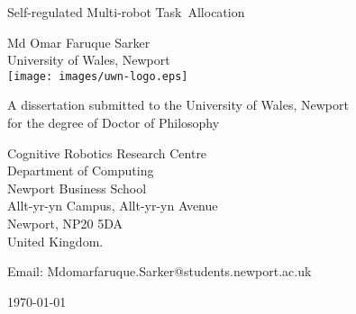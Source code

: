 %
%
%
%
\begin{titlepage}

\begin{center}
\noindent
\huge
Self-regulated Multi-robot Task~Allocation
\end{center}

\begin{center}
\noindent
\huge
Md Omar Faruque Sarker\\[10pt]
\large
University of Wales, Newport\\[16pt]
\texttt{[image: images/uwn-logo.eps]}
\end{center}

\begin{center}
\noindent
\large
A dissertation submitted to the University of Wales, Newport\\
for the degree of Doctor of Philosophy\\
\end{center}

\begin{center}
\noindent
Cognitive Robotics Research Centre\\
Department of Computing\\
Newport Business School\\
Allt-yr-yn Campus, Allt-yr-yn Avenue\\
Newport, NP20 5DA\\
United Kingdom.\\
\end{center}

\begin{center}
\noindent
Email: Mdomarfaruque.Sarker@students.newport.ac.uk \\
\end{center}

\begin{center}
\noindent
\today
\end{center}


\end{titlepage}
